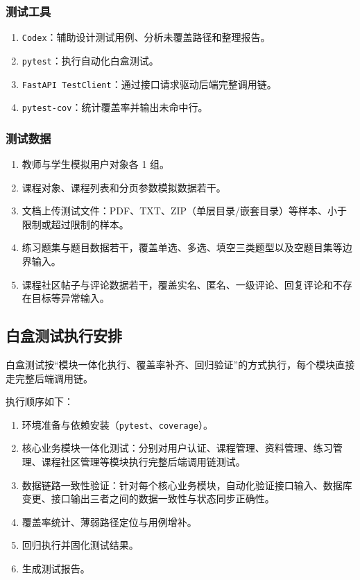 \documentclass[12pt,a4paper]{ctexart}
\begin{document}
\subsubsection{测试工具}

\begin{enumerate}
  \item \texttt{Codex}：辅助设计测试用例、分析未覆盖路径和整理报告。
  \item \texttt{pytest}：执行自动化白盒测试。
  \item \texttt{FastAPI TestClient}：通过接口请求驱动后端完整调用链。
  \item \texttt{pytest-cov}：统计覆盖率并输出未命中行。
\end{enumerate}

\subsubsection{测试数据}

\begin{enumerate}
  \item 教师与学生模拟用户对象各 1 组。
  \item 课程对象、课程列表和分页参数模拟数据若干。
  \item 文档上传测试文件：PDF、TXT、ZIP（单层目录/嵌套目录）等样本、小于限制或超过限制的样本。
  \item 练习题集与题目数据若干，覆盖单选、多选、填空三类题型以及空题目集等边界输入。
  \item 课程社区帖子与评论数据若干，覆盖实名、匿名、一级评论、回复评论和不存在目标等异常输入。
\end{enumerate}

\subsection{白盒测试执行安排}

白盒测试按“模块一体化执行、覆盖率补齐、回归验证”的方式执行，每个模块直接走完整后端调用链。

执行顺序如下：

\begin{enumerate}
  \item 环境准备与依赖安装（\texttt{pytest}、\texttt{coverage}）。
  \item 核心业务模块一体化测试：分别对用户认证、课程管理、资料管理、练习管理、课程社区管理等模块执行完整后端调用链测试。
  \item 数据链路一致性验证：针对每个核心业务模块，自动化验证接口输入、数据库变更、接口输出三者之间的数据一致性与状态同步正确性。
  \item 覆盖率统计、薄弱路径定位与用例增补。
  \item 回归执行并固化测试结果。
  \item 生成测试报告。
\end{enumerate}
\end{document}
